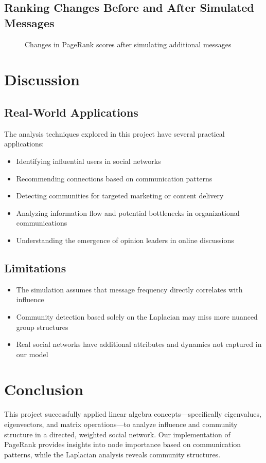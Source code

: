 \documentclass[12pt,letterpaper]{article}
\begin{document}
\subsection{Ranking Changes Before and After Simulated Messages}
\begin{figure}[H]
    \caption{Changes in PageRank scores after simulating additional messages}
    \label{fig:changes}
\end{figure}

\section{Discussion}
\subsection{Real-World Applications}
The analysis techniques explored in this project have several practical applications:
\begin{itemize}
    \item Identifying influential users in social networks
    \item Recommending connections based on communication patterns
    \item Detecting communities for targeted marketing or content delivery
    \item Analyzing information flow and potential bottlenecks in organizational communications
    \item Understanding the emergence of opinion leaders in online discussions
\end{itemize}

\subsection{Limitations}
\begin{itemize}
    \item The simulation assumes that message frequency directly correlates with influence
    \item Community detection based solely on the Laplacian may miss more nuanced group structures
    \item Real social networks have additional attributes and dynamics not captured in our model
\end{itemize}

\section{Conclusion}
This project successfully applied linear algebra concepts—specifically eigenvalues, eigenvectors, and matrix operations—to analyze influence and community structure in a directed, weighted social network. Our implementation of PageRank provides insights into node importance based on communication patterns, while the Laplacian analysis reveals community structures.
\end{document}
